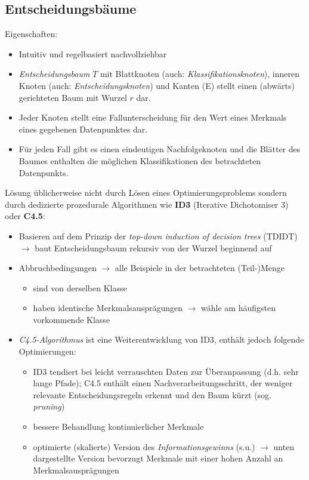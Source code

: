 \subsection{Entscheidungsbäume}
\label{decisionTrees}
Eigenschaften:
\begin{itemize}
    \item Intuitiv und regelbasiert nachvollziehbar
    \item \emph{Entscheidungsbaum} $T$ mit Blattknoten (auch: \emph{Klassifikationsknoten}), inneren Knoten (auch: \emph{Entscheidungsknoten}) und Kanten (E) stellt einen (abwärts) gerichteten Baum mit Wurzel $r$ dar.
    \item Jeder Knoten stellt eine Fallunterscheidung für den Wert eines Merkmals eines gegebenen Datenpunktes dar.
    \item Für jeden Fall gibt es einen eindeutigen Nachfolgeknoten und die Blätter des Baumes enthalten die möglichen Klassifikationen des betrachteten Datenpunkts.
\end{itemize}



Lösung üblicherweise nicht durch Lösen eines Optimierungsproblems sondern durch dedizierte prozedurale Algorithmen wie \textbf{ID3} (Iterative Dichotomiser 3) oder \textbf{C4.5}:
\begin{itemize}
    \item Basieren auf dem Prinzip der \emph{top-down induction of decision trees} (TDIDT) $\rightarrow$ baut Entscheidungsbaum rekursiv von der Wurzel beginnend auf
    \item Abbruchbedingungen $\rightarrow$ alle Beispiele in der betrachteten (Teil-)Menge
    \begin{itemize}
        \item sind von derselben Klasse
        \item haben identische Merkmalsausprägungen $\rightarrow$ wähle am häufigsten vorkommende Klasse
    \end{itemize}
    \item \emph{C4.5-Algorithmus} ist eine Weiterentwicklung von ID3, enthält jedoch folgende Optimierungen:
    \begin{itemize}
        \item ID3 tendiert bei leicht verrauschten Daten zur Überanpassung (d.h. sehr lange Pfade); C4.5 enthält einen Nachverarbeitungsschritt, der weniger relevante Entscheidungsregeln erkennt und den Baum kürzt (sog. \emph{pruning})
        \item bessere Behandlung kontinuierlicher Merkmale
        \item optimierte (skalierte) Version des \emph{Informationsgewinns} (s.u.) $\rightarrow$ unten dargestellte Version bevorzugt Merkmale mit einer hohen Anzahl an Merkmalsausprägungen
    \end{itemize}
\end{itemize}

